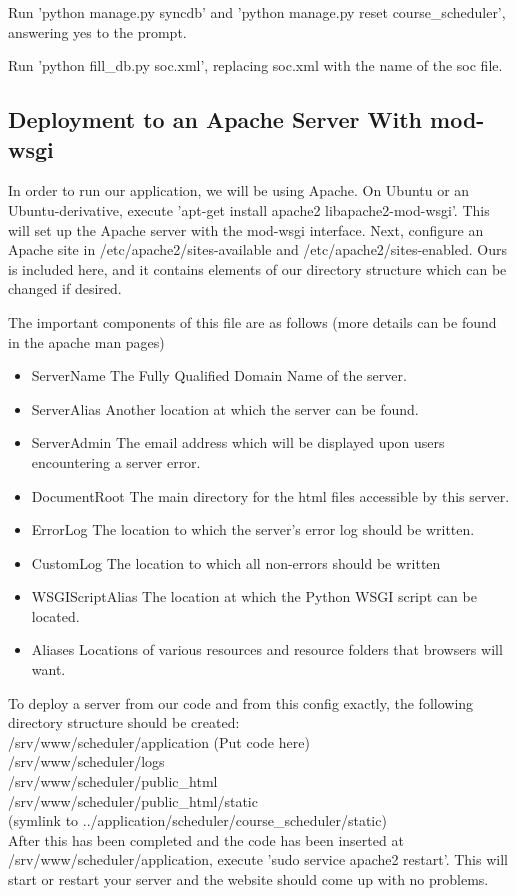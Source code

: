 \documentclass[pdftex,12pt,letter]{article}
\begin{document}
Run 'python manage.py syncdb' and 'python manage.py reset course\_scheduler', answering yes to the prompt.

Run 'python fill\_db.py soc.xml', replacing soc.xml with the name of the soc file.

\subsection{Deployment to an Apache Server With mod-wsgi}
In order to run our application, we will be using Apache. On Ubuntu or an Ubuntu-derivative, execute 'apt-get install apache2 libapache2-mod-wsgi'. This will set up the Apache server with the mod-wsgi interface. Next, configure an Apache site in /etc/apache2/sites-available and /etc/apache2/sites-enabled. Ours is included here, and it contains elements of our directory structure which can be changed if desired.

The important components of this file are as follows (more details can be found in the apache man pages)
\begin{itemize}
\item ServerName
\subitem The Fully Qualified Domain Name of the server.
\item ServerAlias
\subitem Another location at which the server can be found.
\item ServerAdmin
\subitem The email address which will be displayed upon users encountering a server error.
\item DocumentRoot
\subitem The main directory for the html files accessible by this server.
\item ErrorLog
\subitem The location to which the server's error log should be written.
\item CustomLog
\subitem The location to which all non-errors should be written
\item WSGIScriptAlias
\subitem The location at which the Python WSGI script can be located.
\item Aliases
\subitem Locations of various resources and resource folders that browsers will want.
\end{itemize}
To deploy a server from our code and from this config exactly, the following directory structure should be created:\\
/srv/www/scheduler/application (Put code here)\\
/srv/www/scheduler/logs\\
/srv/www/scheduler/public\_html\\
/srv/www/scheduler/public\_html/static\\
(symlink to ../application/scheduler/course\_scheduler/static)\\
After this has been completed and the code has been inserted at /srv/www/scheduler/application, execute 'sudo service apache2 restart'. This will start or restart your server and the website should come up with no problems.
\end{document}
